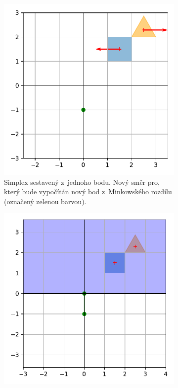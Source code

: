 \begin{figure}
\begin{subfigure}[t]{0.3\textwidth}
         \centering
    \includegraphics[scale=0.5]{obrazky-figures/gjk/gjk_point.pdf}
    \caption{Simplex sestavený z~jednoho bodu. Nový směr pro, který bude vypočítán nový bod z~Minkowského rozdílu (označený zelenou barvou).}
    \label{fig:gjk_point}
     \end{subfigure}
\hfill
\begin{subfigure}[t]{0.3\textwidth}
         \centering
    \includegraphics[scale=0.5]{obrazky-figures/gjk/gjk_line.pdf}

\end{subfigure}
\end{figure}
